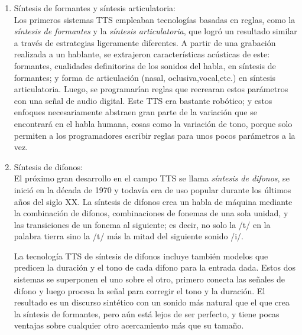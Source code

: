 \begin{enumerate}
	\item  Síntesis de formantes y síntesis articulatoria: \\Los primeros sistemas TTS empleaban tecnologías basadas en reglas, como la \textit{síntesis de formantes} y la \textit{síntesis articulatoria}, que logró un resultado similar a través de estrategias ligeramente diferentes. A partir de una grabación realizada a un hablante, se extrajeron características acústicas de este: formantes, cualidades definitorias de los sonidos del habla, en síntesis de formantes; y forma de articulación (nasal, oclusiva,vocal,etc.) en síntesis articulatoria. Luego, se programarían reglas que recrearan estos parámetros con una señal de audio digital. Este TTS era bastante robótico; y estos enfoques necesariamente abstraen gran parte de la variación que se encontrará en el habla humana, cosas como la variación de tono, porque solo permiten a los programadores escribir reglas para unos pocos parámetros a la vez.
	
	\item Síntesis de difonos: \\ El próximo gran desarrollo en el campo TTS se llama \textit{síntesis de difonos}, se inició en la década de 1970 y todavía era de uso popular durante los últimos años del siglo XX. La síntesis de difonos crea  un habla de máquina mediante la combinación de difonos, combinaciones de fonemas de una sola unidad, y las transiciones de un fonema al siguiente; es decir, no solo la /t/ en la palabra tierra sino la /t/ más la mitad del siguiente sonido /i/. 
	
	La tecnología TTS de síntesis de difonos incluye también modelos que predicen la duración y el tono de cada difono para la entrada dada. Estos dos sistemas se superponen el uno sobre el otro, primero conecta las señales de difono y luego procesa la señal para corregir el tono y la duración. El resultado es un discurso  sintético con un sonido más natural que el que crea la síntesis de formantes, pero aún está lejos de ser perfecto, y tiene pocas ventajas sobre cualquier otro acercamiento más que su tamaño. 
	

\end{enumerate}
